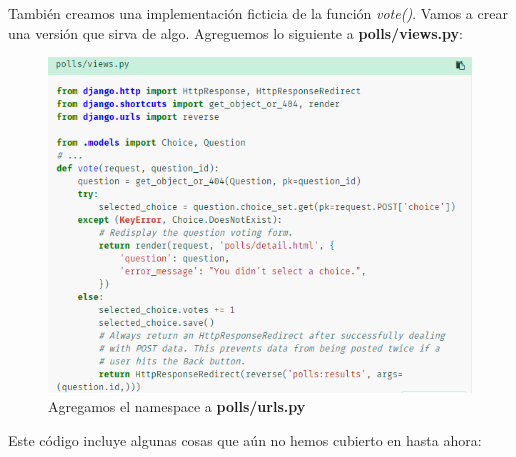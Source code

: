 \documentclass[10pt]{article}
\begin{document}
También creamos una implementación ficticia de la función \textit{vote()}. Vamos a crear una versión que sirva de algo. Agreguemos lo siguiente a \textbf{polls/views.py}:

\begin{figure}[H]
\begin{center}
\includegraphics[scale=1]{figuras/3/34/341/img3.png}
\caption{Agregamos el namespace a \textbf{polls/urls.py}}
\end{center}
\end{figure}

Este código incluye algunas cosas que aún no hemos cubierto en hasta ahora:
\end{document}
